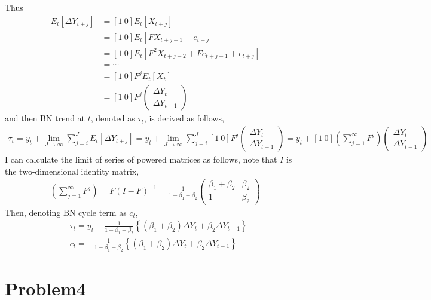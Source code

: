 \documentclass{article}
\begin{document}
 Thus
\begin{align*}
	E_t \left[\Delta Y_{t+j}\right] &= [1\ 0 ]E_t \left[X_{t+j}\right]\\
	&= [1\ 0] E_t \left[ F X_{t+j-1} + e_{t+j} \right]\\
	&= [1\ 0] E_t \left[ F^2 X_{t+j-2} + F e_{t+j-1} + e_{t+j}\right]\\
	&= \cdots\\
	&= [1\ 0] F^j E_t \left[ X_t \right]\\
	&= [1\ 0] F^j \begin{pmatrix} \Delta Y_t\\ \Delta Y_{t-1} \end{pmatrix}
\end{align*}
and then BN trend at $t$, denoted as $\tau_t$, is derived as follows,
\begin{align*}
	\tau_t = y_t + \lim_{J \to \infty} \sum_{j = i}^J E_t\left[ \Delta Y_{t+j} \right] = y_t +  \lim_{J \to \infty} \sum_{j = i}^J [1\ 0] F^j \begin{pmatrix} \Delta Y_t\\ \Delta Y_{t-1} \end{pmatrix} = y_t + [1\ 0] \left( \sum_{j=1}^{\infty} F^j \right) \begin{pmatrix} \Delta Y_t\\ \Delta Y_{t-1} \end{pmatrix}
\end{align*}
I can calculate the limit of series of powered matrices as follows, note that $I$ is the two-dimensional identity matrix,
\begin{align*}
	 \left( \sum_{j=1}^{\infty} F^j \right) = F \left( I - F\right)^{-1} = \frac{1}{1-\beta_1 -\beta_2} \begin{pmatrix} \beta_1 + \beta_2 & \beta_2\\ 1 & \beta_2 \end{pmatrix}
\end{align*}
Then, denoting BN cycle term as $c_t$,  
\begin{align*}
	&\tau_t = y_t + \frac{1}{1-\beta_1 -\beta_2} \left\{ (\beta_1 + \beta_2)\Delta Y_t + \beta_2 \Delta Y_{t-1} \right\}\\
	&c_t = - \frac{1}{1-\beta_1 -\beta_2} \left\{ (\beta_1 + \beta_2)\Delta Y_t + \beta_2 \Delta Y_{t-1} \right\}
\end{align*}


\section{Problem4}
\end{document}
